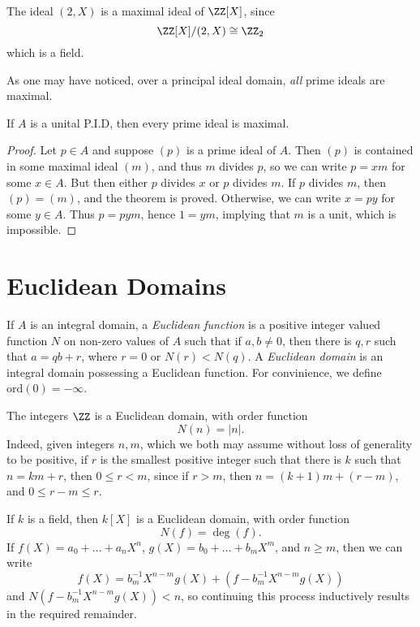 \begin{example}
    The ideal $(2,X)$ is a maximal ideal of $\ZZ[X]$, since
    \[ \ZZ[X]/(2,X) \cong \ZZ_2 \]
    which is a field.
\end{example}

As one may have noticed, over a principal ideal domain, \emph{all} prime ideals are maximal.

\begin{theorem}
    If $A$ is a unital P.I.D, then every prime ideal is maximal.
\end{theorem}
\begin{proof}
    Let $p \in A$ and suppose $(p)$ is a prime ideal of $A$. Then $(p)$ is contained in some maximal ideal $(m)$, and thus $m$ divides $p$, so we can write $p = xm$ for some $x \in A$. But then either $p$ divides $x$ or $p$ divides $m$. If $p$ divides $m$, then $(p) = (m)$, and the theorem is proved. Otherwise, we can write $x = py$ for some $y \in A$. Thus $p = pym$, hence $1 = ym$, implying that $m$ is a unit, which is impossible.
\end{proof}

\section{Euclidean Domains}

If $A$ is an integral domain, a \emph{Euclidean function} is a positive integer valued function $N$ on non-zero values of $A$ such that if $a,b \neq 0$, then there is $q,r$ such that $a = qb + r$, where $r = 0$ or $N(r) < N(q)$. A \emph{Euclidean domain} is an integral domain possessing a Euclidean function. For convinience, we define $\text{ord}(0) = -\infty$.

\begin{example}
    The integers $\ZZ$ is a Euclidean domain, with order function
    \[ N(n) = |n|. \]
    Indeed, given integers $n,m$, which we both may assume without loss of generality to be positive, if $r$ is the smallest positive integer such that there is $k$ such that $n = km + r$, then $0 \leq r < m$, since if $r > m$, then $n = (k+1)m + (r - m)$, and $0 \leq r-m \leq r$.
\end{example}

\begin{example}
    If $k$ is a field, then $k[X]$ is a Euclidean domain, with order function
    \[ N(f) = \deg(f). \]
    If $f(X) = a_0 + \dots + a_nX^n$, $g(X) = b_0 + \dots + b_mX^m$, and $n \geq m$, then we can write
    \[ f(X) = b_m^{-1} X^{n-m} g(X) + (f - b_m^{-1} X^{n-m}g(X)) \]
    and $N(f - b_m^{-1} X^{n-m}g(X)) < n$, so continuing this process inductively results in the required remainder.
\end{example}

